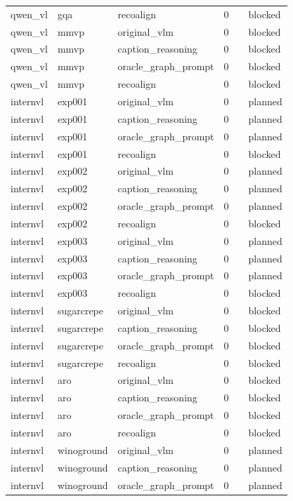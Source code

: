\begin{table}[t]
\begin{tabular}{llllll}
qwen\_vl & gqa & recoalign & 0 &  & blocked \\
qwen\_vl & mmvp & original\_vlm & 0 &  & blocked \\
qwen\_vl & mmvp & caption\_reasoning & 0 &  & blocked \\
qwen\_vl & mmvp & oracle\_graph\_prompt & 0 &  & blocked \\
qwen\_vl & mmvp & recoalign & 0 &  & blocked \\
internvl & exp001 & original\_vlm & 0 &  & planned \\
internvl & exp001 & caption\_reasoning & 0 &  & planned \\
internvl & exp001 & oracle\_graph\_prompt & 0 &  & planned \\
internvl & exp001 & recoalign & 0 &  & blocked \\
internvl & exp002 & original\_vlm & 0 &  & planned \\
internvl & exp002 & caption\_reasoning & 0 &  & planned \\
internvl & exp002 & oracle\_graph\_prompt & 0 &  & planned \\
internvl & exp002 & recoalign & 0 &  & blocked \\
internvl & exp003 & original\_vlm & 0 &  & planned \\
internvl & exp003 & caption\_reasoning & 0 &  & planned \\
internvl & exp003 & oracle\_graph\_prompt & 0 &  & planned \\
internvl & exp003 & recoalign & 0 &  & blocked \\
internvl & sugarcrepe & original\_vlm & 0 &  & blocked \\
internvl & sugarcrepe & caption\_reasoning & 0 &  & blocked \\
internvl & sugarcrepe & oracle\_graph\_prompt & 0 &  & blocked \\
internvl & sugarcrepe & recoalign & 0 &  & blocked \\
internvl & aro & original\_vlm & 0 &  & blocked \\
internvl & aro & caption\_reasoning & 0 &  & blocked \\
internvl & aro & oracle\_graph\_prompt & 0 &  & blocked \\
internvl & aro & recoalign & 0 &  & blocked \\
internvl & winoground & original\_vlm & 0 &  & planned \\
internvl & winoground & caption\_reasoning & 0 &  & planned \\
internvl & winoground & oracle\_graph\_prompt & 0 &  & planned \\

\end{tabular}
\end{table}
